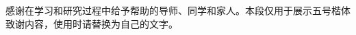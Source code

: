 \documentclass[degree=master,degree-type=academic,fontset=fandol]{gzuthesis}
\begin{document}
\frontmatter
\maketitle
\makecommittee
\makedeclarations

\tableofcontents
\listoffigures
\listoftables
\mainmatter



\backmatter
\begin{acknowledgements}
感谢在学习和研究过程中给予帮助的导师、同学和家人。本段仅用于展示五号楷体致谢内容，使用时请替换为自己的文字。
\end{acknowledgements}
\printbibliography
\appendix


\end{document}
